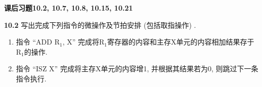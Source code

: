 \documentclass[UTF8]{report}
\newcommand{\problem}[1]{{\setlength{\parskip}{10pt}\noindent \bf{#1}}}
\begin{document}

\maketitle



\textbf{课后习题10.2, 10.7, 10.8, 10.15, 10.21}

\problem{10.2} 写出完成下列指令的微操作及节拍安排 (包括取指操作) . 
\begin{enumerate}[label=(\arabic*)]
    \item 指令 ``ADD $\mathrm{R_1}$, X'' 完成将$\mathrm{R_1}$寄存器的内容和主存X单元的内容相加结果存于$\mathrm{R_1}$的操作. 
    \item 指令 ``ISZ X'' 完成将主存X单元的内容增1, 并根据其结果若为0, 则跳过下一条指令执行. 
\end{enumerate}
\end{document}
